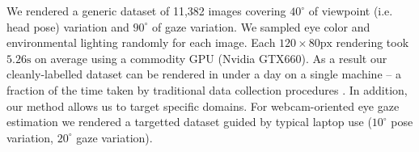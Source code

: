 We rendered a generic \dataset dataset of 11,382 images covering $40^{\circ}$ of viewpoint (i.e. head pose) variation and $90^{\circ}$ of gaze variation.
We sampled eye color and environmental lighting randomly for each image.
Each $120\!\times\!80\textrm{px}$ rendering took $5.26\textrm{s}$ on average using a commodity GPU (Nvidia GTX660).
As a result our cleanly-labelled dataset can be rendered in under a day on a single machine -- a fraction of the time taken by traditional data collection procedures \cite{zhang15_cvpr,sugano2014learning}. 
In addition, our method allows us to target specific domains. For webcam-oriented eye gaze estimation we rendered a targetted dataset guided by typical laptop use ($10^{\circ}$ pose variation, $20^{\circ}$ gaze variation).
